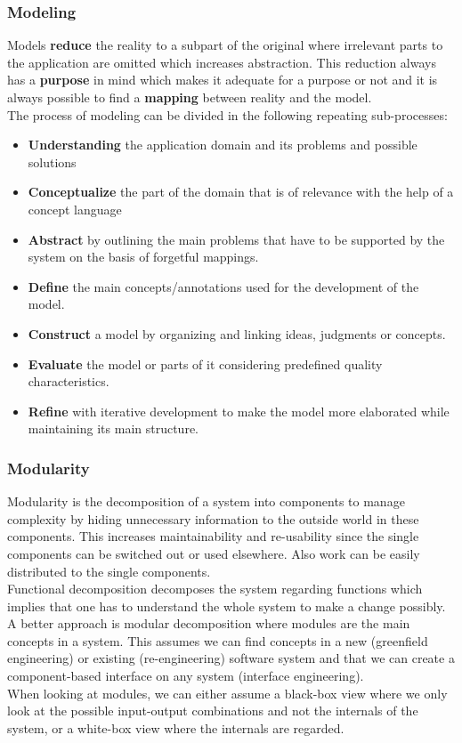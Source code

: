 \subsubsection{Modeling}
Models \textbf{reduce} the reality to a subpart of the original where irrelevant parts to the application are omitted which increases abstraction.
This reduction always has a \textbf{purpose} in mind which makes it  adequate for a purpose or not and it is always possible to find a \textbf{mapping} between reality and the model.\\
The process of modeling can be divided in the following repeating sub-processes:
\begin{itemize}
  \item \textbf{Understanding} the application domain and its problems and possible solutions
  \item \textbf{Conceptualize} the part of the domain that is of relevance with the help of a concept language
  \item \textbf{Abstract} by outlining the main problems that have to be supported by the system on the basis of forgetful mappings.
  \item \textbf{Define} the main concepts/annotations used for the development of the model.
  \item \textbf{Construct} a model by organizing and linking ideas, judgments or concepts.
  \item \textbf{Evaluate} the model or parts of it considering predefined quality characteristics.
  \item \textbf{Refine} with iterative development to make the model more elaborated while maintaining its main structure.
\end{itemize}

\subsubsection{Modularity}
Modularity is the decomposition of a system into components to manage complexity by hiding unnecessary information to the outside world in these components.
This increases maintainability and re-usability since the single components can be switched out or used elsewhere.
Also work can be easily distributed to the single components.\\
Functional decomposition decomposes the system regarding functions which implies that one has to understand the whole system to make a change possibly.
A better approach is modular decomposition where modules are the main concepts in a system.
This assumes we can find concepts in a new (greenfield engineering) or existing (re-engineering) software system  and that we can create a component-based interface on any system (interface engineering).\\
When looking at modules, we can either assume a black-box view where we only look at the possible input-output combinations and not the internals of the system, or a white-box view where the internals are regarded.

